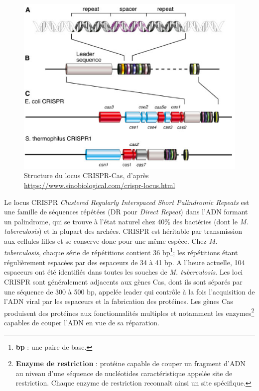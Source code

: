\documentclass[twoside,a4paper,11pt,frenchb,openany]{report}
\begin{document}
\begin{figure}[h!]
\centering
\includegraphics[scale=0.6]{crispr.png}
\caption{Structure du locus CRISPR-Cas, d'après\\ \url{https://www.sinobiological.com/crispr-locus.html}}
\end{figure}

Le locus CRISPR \textit{Clustered Regularly Interspaced Short Palindromic Repeats} est une famille de séquences répétées (DR pour \textit{Direct Repeat}) dans l'ADN formant un palindrome, qui se trouve à l'état naturel chez 40\% des bactéries (dont le \textit{M. tuberculosis}) et la plupart des archées. CRISPR est héritable par transmission aux cellules filles et se conserve donc pour une même espèce. Chez \textit{M. tuberculosis}, chaque série de répétitions contient 36 bp\footnote{\textbf{bp} : une paire de base.}; les répétitions étant régulièrement espacées par des espaceurs de 34 à 41 bp. A l'heure actuelle, 104 espaceurs ont été identifiés dans toutes les souches de \textit{M. tuberculosis}. Les loci CRISPR sont généralement adjacents aux gènes Cas, dont ils sont séparés par une séquence de 300 à 500 bp, appelée leader qui contrôle à la fois l'acquisition de l'ADN viral par les espaceurs et la fabrication des protéines. Les gènes Cas produisent des protéines aux fonctionnalités multiples et notamment les enzymes\footnote{\textbf{Enzyme de restriction} : protéine capable de couper un fragment d'ADN au niveau d'une séquence de nucléotides caractéristique appelée site de restriction. Chaque enzyme de restriction reconnaît ainsi un site spécifique.} capables de couper l'ADN en vue de sa réparation.
\end{document}
